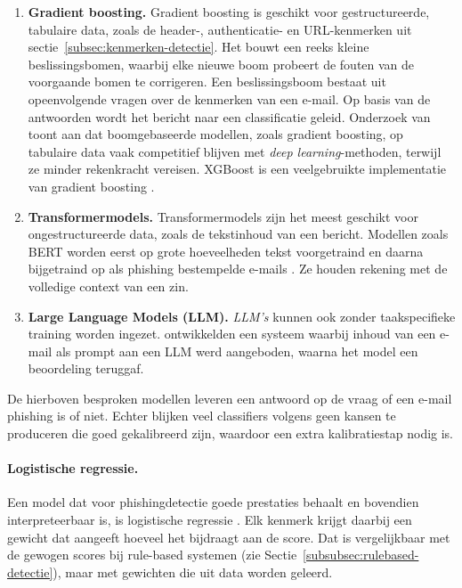 \begin{enumerate}
    \item \textbf{Gradient boosting.} Gradient boosting is geschikt voor gestructureerde, tabulaire data, zoals de header-, authenticatie- en URL-ken\-merken uit sectie~\ref{subsec:kenmerken-detectie}. Het bouwt een reeks kleine beslissingsbomen, waarbij elke nieuwe boom probeert de fouten van de voorgaande bomen te corrigeren. Een beslissingsboom bestaat uit opeenvolgende vragen over de kenmerken van een e-mail. Op basis van de antwoorden wordt het bericht naar een classificatie geleid. Onderzoek van \textcite{Grinsztajn2022} toont aan dat boomgebaseerde modellen, zoals gradient boosting, op tabulaire data vaak competitief blijven met \emph{deep learning}-methoden, terwijl ze minder rekenkracht vereisen. XGBoost is een veelgebruikte implementatie van gradient boosting \autocite{Chen2016}.
    \item \textbf{Transformermodels.} Transformermodels zijn het meest geschikt voor ongestructureerde data, zoals de tekstinhoud van een bericht. Modellen zoals BERT worden eerst op grote hoeveelheden tekst voorgetraind en daarna bijgetraind op als phishing bestempelde e-mails \autocite{Devlin2019}. Ze houden rekening met de volledige context van een zin. 
    \item \textbf{Large Language Models (LLM).} \emph{LLM's} kunnen ook zonder taakspecifieke training worden ingezet. \textcite{Koide2025} ontwikkelden een systeem waarbij inhoud van een e-mail als prompt aan een LLM werd aangeboden, waarna het model een beoordeling teruggaf.
\end{enumerate}

De hierboven besproken modellen leveren een antwoord op de vraag of een e-mail phishing is of niet. Echter blijken veel classifiers volgens \textcite{Niculescu-Mizil2005} geen kansen te produceren die goed gekalibreerd zijn, waardoor een extra kalibratiestap nodig is.

\paragraph{Logistische regressie.}
\label{subsubsec:logistische-regressie}
Een model dat voor phishingdetectie goede prestaties behaalt en bovendien interpreteerbaar is, is logistische regressie \autocite{Alhuzali2025}. Elk kenmerk krijgt daarbij een gewicht dat aangeeft hoeveel het bijdraagt aan de score. Dat is vergelijkbaar met de gewogen scores bij rule-based systemen (zie Sectie~\ref{subsubsec:rulebased-detectie}), maar met gewichten die uit data worden geleerd.

